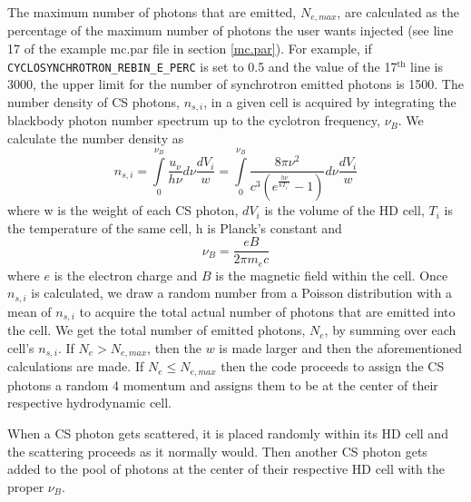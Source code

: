 \documentclass[12pt,a4paper]{article}
\begin{document}
The maximum number of photons that are emitted, $N_{e,max}$, are calculated as the percentage of the maximum number of photons the user wants injected (see line 17 of the example mc.par file in section \ref{mc.par}). For example, if \texttt{CYCLOSYNCHROTRON\_REBIN\_E\_PERC} is set to 0.5 and the value of the 17$^\textrm{th}$ line is 3000, the upper limit for the number of synchrotron emitted photons is 1500. The number density of CS photons, $n_{s,i}$, in a given cell is acquired by integrating the blackbody photon number spectrum up to the cyclotron frequency, $\nu_B$. We calculate the number density as
\begin{equation}
n_{s,i}=\int\limits_{0}^{\nu_B}\frac{u_\nu}{h \nu}d\nu\frac{dV_i}{w}=\int\limits_{0}^{\nu_B}\frac{8\pi \nu^2 }{c^3 (e^\frac{h\nu}{kT_i'}-1 )}d\nu\frac{dV_i}{w}
\end{equation}
 where w is the weight of each CS photon, $dV_i$ is the volume of the HD cell, $T_i$ is the temperature of the same cell, h is Planck's constant and 
\begin{equation}
\nu_B=\frac{eB}{2\pi m_e c}
\end{equation}
where $e$ is the electron charge and $B$ is the magnetic field within the cell. Once $n_{s,i}$ is calculated, we draw a random number from a Poisson distribution with a mean of $n_{s,i}$ to acquire the total actual number of photons that are emitted into the cell. We get the total number of emitted photons, $N_e$, by summing over each cell's $n_{s,i}$. If $N_e > N_{e,max}$, then the $w$ is made larger and then the aforementioned calculations are made. If $N_e \le N_{e,max}$ then the code proceeds to assign the CS photons a random 4 momentum and assigns them to be at the center of their respective hydrodynamic cell.

When a CS photon gets scattered, it is placed randomly within its HD cell and the scattering proceeds as it normally would. Then another CS photon gets added to the pool of photons at the center of their respective HD cell with the proper $\nu_B$.
\end{document}
